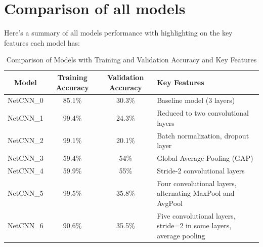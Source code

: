 \documentclass[12pt]{article}
\begin{document}
\section*{Comparison of all models}
Here's a summary of all models performance with highlighting on the key features each model has:


\begin{table}[ht]
    \centering
    \begin{tabular}{|c|c|c|p{6cm}|}
        \hline
        \textbf{Model} & \textbf{Training Accuracy} & \textbf{Validation Accuracy} & \textbf{Key Features} \\
        \hline
        NetCNN\_0 & 85.1\% & 30.3\% & Baseline model (3 layers) \\
        \hline
        NetCNN\_1 & 99.4\% & 24.3\% & Reduced to two convolutional layers \\
        \hline
        NetCNN\_2 & 99.1\% & 20.1\% & Batch normalization, dropout layer \\
        \hline
        NetCNN\_3 & 59.4\% & 54\% & Global Average Pooling (GAP) \\
        \hline
        NetCNN\_4 & 59.9\% & 55\% & Stride-2 convolutional layers \\
        \hline
        NetCNN\_5 & 99.5\% & 35.8\% & Four convolutional layers, alternating MaxPool and AvgPool \\
        \hline
        NetCNN\_6 & 90.6\% & 35.5\% & Five convolutional layers, stride=2 in some layers, average pooling \\
        \hline
    \end{tabular}
    \caption{Comparison of Models with Training and Validation Accuracy and Key Features}
    \label{tab:model_comparison}
\end{table}
\end{document}
